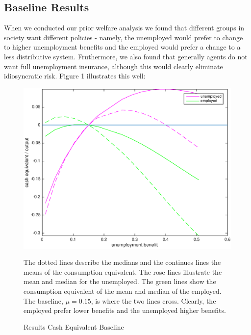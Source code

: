 \documentclass[a4paper,12pt]{article}
\begin{document}
\subsection{Baseline Results}

When we conducted our prior welfare analysis we found that different groups in society want different policies - namely, the unemployed would prefer to change to higher unemployment benefits and the employed would prefer a change to a less distributive system. Fruthermore, we also found that generally agents do not want full unemployment insurance, although this would clearly eliminate idiosyncratic risk. 
Figure 1 illustrates this well: 

\begin{figure}
\caption{Results Cash Equivalent Baseline } 
\label{baseline_ue_vs_e}	%
\centering
\includegraphics[scale=.7]{Cash_equivalent_baseline}  %

\begin{minipage}{0.8\linewidth}
\footnotesize{The dotted lines describe the medians and the continues lines the means of the consumption equivalent. The rose lines illustrate the mean and median for the unemployed. The green lines show the consumption equivalent of the mean and median of the employed. The baseline, $\mu = 0.15$, is where the two lines cross. Clearly, the employed prefer lower benefits and the unemployed higher benefits. }
\end{minipage}

\end{figure}
\end{document}
